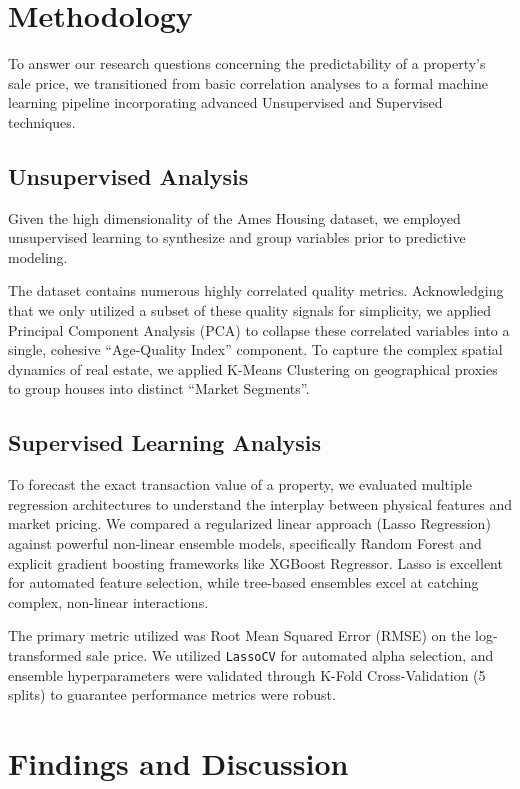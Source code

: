 \documentclass[eng]{ajceam-class}
\begin{document}
\section{Methodology}

To answer our research questions concerning the predictability of a property's sale price, we transitioned from basic correlation analyses to a formal machine learning pipeline incorporating advanced Unsupervised and Supervised techniques.

\subsection{Unsupervised Analysis}

Given the high dimensionality of the Ames Housing dataset, we employed unsupervised learning to synthesize and group variables prior to predictive modeling. 

The dataset contains numerous highly correlated quality metrics. Acknowledging that we only utilized a subset of these quality signals for simplicity, we applied Principal Component Analysis (PCA) to collapse these correlated variables into a single, cohesive ``Age-Quality Index'' component. To capture the complex spatial dynamics of real estate, we applied K-Means Clustering on geographical proxies to group houses into distinct ``Market Segments''. 

\subsection{Supervised Learning Analysis}

To forecast the exact transaction value of a property, we evaluated multiple regression architectures to understand the interplay between physical features and market pricing. We compared a regularized linear approach (Lasso Regression) against powerful non-linear ensemble models, specifically Random Forest and explicit gradient boosting frameworks like XGBoost Regressor. Lasso is excellent for automated feature selection, while tree-based ensembles excel at catching complex, non-linear interactions.

The primary metric utilized was Root Mean Squared Error (RMSE) on the log-transformed sale price. We utilized \texttt{LassoCV} for automated alpha selection, and ensemble hyperparameters were validated through K-Fold Cross-Validation (5 splits) to guarantee performance metrics were robust.

\section{Findings and Discussion}
\end{document}
